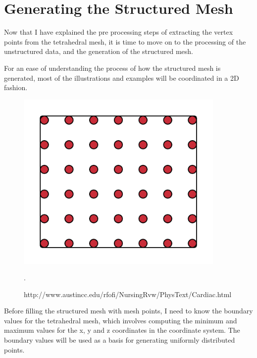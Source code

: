 \section{Generating the Structured Mesh}
\label{generating_the structured_mesh}
Now that I have explained the pre processing steps of extracting the vertex points from the tetrahedral mesh, it is time to move on to the processing of the unstructured data, and the generation of the structured mesh.

For an ease of understanding the process of how the structured mesh is generated, most of the illustrations and examples will be coordinated in a 2D fashion.

\begin{figure}[h]
 \centering 
     \includegraphics[width=0.9\textwidth]{bilder/m_grid_points}
     \caption{http://www.austincc.edu/rfofi/NursingRvw/PhysText/Cardiac.html}.
     \label{m_grid_points.png}
\end{figure}

Before filling the structured mesh with mesh points, I need to know the boundary values for the tetrahedral mesh, which involves computing the minimum and maximum values for the x, y and z coordinates in the coordinate system. The boundary values will be used as a basis for generating uniformly distributed points.

